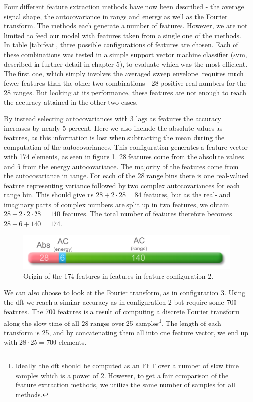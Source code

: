 Four different feature extraction methods have now been described - the average signal shape, the autocovariance in range and energy as well as the Fourier transform. The methods each generate a number of features. However, we are not limited to feed our model with features taken from a single one of the methods. In table \ref{tab:feat}, three possible configurations of features are chosen. Each of these combinations was tested in a simple support vector machine classifier (\gls{svm}, described in further detail in chapter 5), to evaluate which was the most efficient. The first one, which simply involves the averaged sweep envelope, requires much fewer features than the other two combinations - 28 positive real numbers for the 28 ranges. But looking at its performance, these features are not enough to reach the accuracy attained in the other two cases. 

By instead selecting autocovariances with 3 lags as features the accuracy increases by nearly 5 percent. Here we also include the absolute values as features, as this information is lost when subtracting the mean during the computation of the autocovariances. This configuration generates a feature vector with 174 elements, as seen in figure \ref{fig:feat_fig}. 28 features come from the absolute values and 6 from the energy autocovariance. The majority of the features come from the autocovariance in range. For each of the 28 range bins there is one real-valued feature representing variance followed by two complex autocovariances for each range bin. This should give us $28+2\cdot 28=84$ features, but as the real- and imaginary parts of complex numbers are split up in two features, we obtain $28+2\cdot2\cdot 28=140$ features. The total number of features therefore becomes $28+6+140=174$.

\begin{figure}[h]
	\centering
	\includegraphics[scale=0.8]{figs_temp/features.jpg}
	\caption{Origin of the 174 features in features in feature configuration 2.}
	\label{fig:feat_fig}
\end{figure}

We can also choose to look at the Fourier transform, as in configuration 3. Using the \gls{dft} we reach a similar accuracy as in configuration 2 but require some 700 features. The 700 features is a result of computing a discrete Fourier transform along the slow time of all 28 ranges over 25 samples\footnote{Ideally, the \gls{dft} should be computed as an FFT over a number of slow time samples which is a power of 2. However, to get a fair comparison of the feature extraction methods, we utilize the same number of samples for all methods.}. The length of each transform is 25, and by concatenating them all into one feature vector, we end up with $28\cdot 25=700$ elements. 


